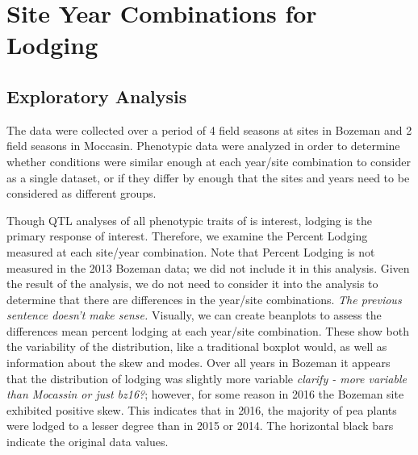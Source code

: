 \documentclass[11pt]{article}\usepackage[]{graphicx}\usepackage[]{color}
\makeatletter
\newenvironment{kframe}{%
 \def\at@end@of@kframe{}%
 \ifinner\ifhmode%
  \def\at@end@of@kframe{\end{minipage}}%
  \begin{minipage}{\columnwidth}%
 \fi\fi%
 \def\FrameCommand##1{\hskip\@totalleftmargin \hskip-\fboxsep
 \colorbox{shadecolor}{##1}\hskip-\fboxsep
     \hskip-\linewidth \hskip-\@totalleftmargin \hskip\columnwidth}%
 \MakeFramed {\advance\hsize-\width
   \@totalleftmargin\z@ \linewidth\hsize
   \@setminipage}}%
 {\par\unskip\endMakeFramed%
 \at@end@of@kframe}
\newenvironment{knitrout}{}{} %
\makeatother
\begin{document}
\section{Site Year Combinations for Lodging}




\subsection{Exploratory Analysis} 
The data were collected over a period of 4 field seasons at sites in Bozeman and 2 field seasons in Moccasin. Phenotypic data were analyzed in order to determine whether conditions were similar enough at each year/site combination to consider as a single dataset, or if they differ by enough that the sites and years need to be considered as different groups.  

Though QTL analyses of all phenotypic traits of is interest, lodging is the primary response of interest. Therefore, we examine the Percent Lodging measured at each site/year combination. Note that Percent Lodging is not measured in the 2013 Bozeman data; we did not include it in this analysis. Given the result of the analysis, we do not need to consider it into the analysis to determine that there are differences in the year/site combinations. {\it The previous sentence doesn't make sense.} Visually, we can create beanplots to assess the differences mean percent lodging at each year/site combination.  These show both the variability of the distribution, like a traditional boxplot would, as well as information about the skew and modes. Over all years in Bozeman it appears that the distribution of lodging was slightly more variable {\it clarify - more variable than Mocassin or just bz16?}; however, for some reason in 2016 the Bozeman site exhibited positive skew.  This indicates that in 2016, the majority of pea plants were lodged to a lesser degree than in 2015 or 2014.  The horizontal black bars indicate the original data values. 


\begin{knitrout}\footnotesize
{}\color{fgcolor}\begin{kframe}


{\ttfamily\noindent\bfseries{}}\end{kframe}
\end{knitrout}
\end{document}
